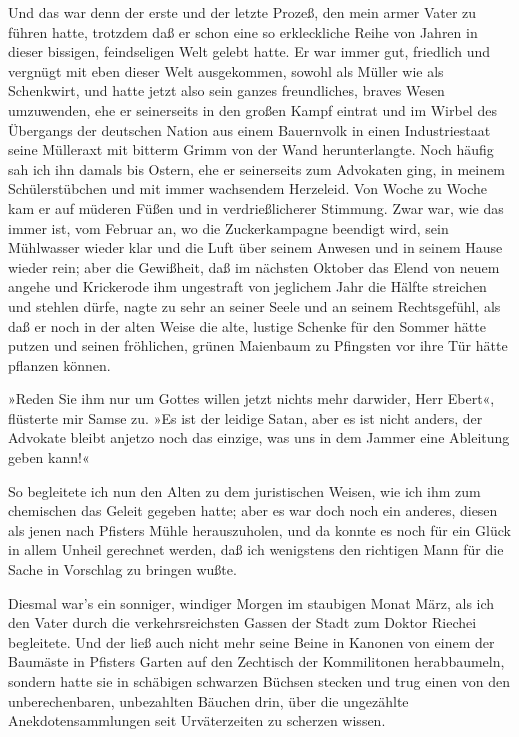 Und das war denn der erste und der letzte Prozeß, den mein armer
Vater zu führen hatte, trotzdem daß er schon eine so erkleckliche
Reihe von Jahren in dieser bissigen, feindseligen Welt gelebt
hatte. Er war immer gut, friedlich und vergnügt mit eben dieser
Welt ausgekommen, sowohl als Müller wie als Schenkwirt, und hatte
jetzt also sein ganzes freundliches, braves Wesen umzuwenden, ehe
er seinerseits in den großen Kampf eintrat und im Wirbel des
Übergangs der deutschen Nation aus einem Bauernvolk in einen
Industriestaat seine Mülleraxt mit bitterm Grimm von der Wand
herunterlangte. Noch häufig sah ich ihn damals bis Ostern, ehe er
seinerseits zum Advokaten ging, in meinem Schülerstübchen und mit
immer wachsendem Herzeleid. Von Woche zu Woche kam er auf müderen
Füßen und in verdrießlicherer Stimmung. Zwar war, wie das immer
ist, vom Februar an, wo die Zuckerkampagne beendigt wird, sein
Mühlwasser wieder klar und die Luft über seinem Anwesen und in
seinem Hause wieder rein; aber die Gewißheit, daß im nächsten
Oktober das Elend von neuem angehe und Krickerode ihm ungestraft
von jeglichem Jahr die Hälfte streichen und stehlen dürfe, nagte zu
sehr an seiner Seele und an seinem Rechtsgefühl, als daß er noch in
der alten Weise die alte, lustige Schenke für den Sommer hätte
putzen und seinen fröhlichen, grünen Maienbaum zu Pfingsten vor
ihre Tür hätte pflanzen können.

»Reden Sie ihm nur um Gottes willen jetzt nichts mehr darwider,
Herr Ebert«, flüsterte mir Samse zu. »Es ist der leidige Satan,
aber es ist nicht anders, der Advokate bleibt anjetzo noch das
einzige, was uns in dem Jammer eine Ableitung geben kann!«

So begleitete ich nun den Alten zu dem juristischen Weisen, wie ich
ihm zum chemischen das Geleit gegeben hatte; aber es war doch noch
ein anderes, diesen als jenen nach Pfisters Mühle herauszuholen,
und da konnte es noch für ein Glück in allem Unheil gerechnet
werden, daß ich wenigstens den richtigen Mann für die Sache in
Vorschlag zu bringen wußte.

Diesmal war's ein sonniger, windiger Morgen im staubigen Monat
März, als ich den Vater durch die verkehrsreichsten Gassen der
Stadt zum Doktor Riechei begleitete. Und der ließ auch nicht mehr
seine Beine in Kanonen von einem der Baumäste in Pfisters Garten
auf den Zechtisch der Kommilitonen herabbaumeln, sondern hatte sie
in schäbigen schwarzen Büchsen stecken und trug einen von den
unberechenbaren, unbezahlten Bäuchen drin, über die ungezählte
Anekdotensammlungen seit Urväterzeiten zu scherzen wissen.

